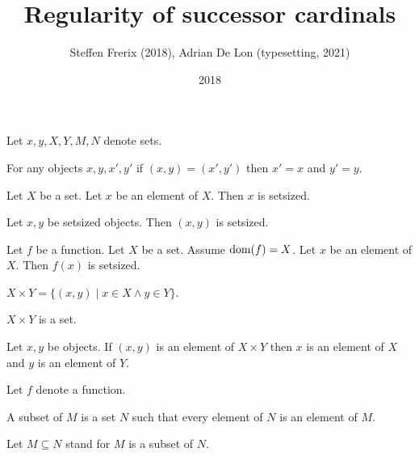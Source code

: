 \documentclass{article}
\title{Regularity of successor cardinals}
\author{Steffen Frerix (2018), Adrian De Lon (typesetting, 2021)}
\date{2018}
\newcommand{\Prod}[2]{#1\times #2}
\begin{document}

  \maketitle

  \begin{forthel}

    Let $x, y, X, Y, M, N$ denote sets.

    \begin{axiom}
      For any objects $x,y,x',y'$ if $(x, y) = (x', y')$ then $x' = x$ and $y' = y$.
    \end{axiom}

    \begin{axiom}
      Let $X$ be a set.
      Let $x$ be an element of $X$. Then $x$ is setsized.
    \end{axiom}

    \begin{axiom}
      Let $x,y$ be setsized objects. Then $(x, y)$ is setsized.
    \end{axiom}

    \begin{axiom}
      Let $f$ be a function.
      Let $X$ be a set.
      Assume $\operatorname{dom}(f) = X$.
      Let $x$ be an element of $X$. Then $f(x)$ is setsized.
    \end{axiom}

    \begin{definition}
      $\Prod{X}{Y} = \{(x,y) \mid x \in X \wedge y \in Y\}$.
    \end{definition}

    \begin{axiom}
      $\Prod{X}{Y}$ is a set.
    \end{axiom}

    \begin{lemma}
      Let $x,y$ be objects.
      If $(x,y)$ is an element of $\Prod{X}{Y}$
      then $x$ is an element of $X$ and $y$ is an element of $Y$.
    \end{lemma}

    Let $f$ denote a function.

    \begin{definition}
      A subset of $M$ is a set $N$ such that every element of $N$ is an element of $M$.
    \end{definition}

    Let $M\subseteq N$ stand for $M$ is a subset of $N$.


\end{forthel}
\end{document}
